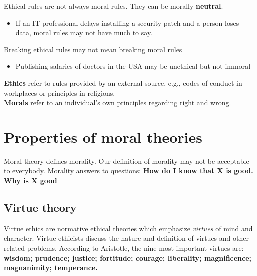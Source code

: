 \documentclass{article}
\newcommand{\worddef}[1]{\hyperref[sec:reference]{\textit{#1}}}
\begin{document}
\begin{flushleft}
Ethical rules are not always moral rules. They can be morally \textbf{neutral}.
\begin{itemize}
  \item If an IT professional delays installing a security patch and a person loses data, moral rules may not have much to say.
\end{itemize}
Breaking ethical rules may not mean breaking moral rules
\begin{itemize}
  \item Publishing salaries of doctors in the USA may be unethical but not immoral
\end{itemize}
\textbf{Ethics} refer to rules provided by an external source, e.g., codes of conduct in workplaces or principles in religions.\\ \textbf{Morals} refer to an individual’s own principles regarding right and wrong.

\end{flushleft}

\section{Properties of moral theories}

\begin{flushleft}
Moral theory defines morality. Our definition of morality may not be acceptable to everybody.
Morality answers to questions: \textbf{How do I know that X is good. Why is X good}
\end{flushleft}

\subsection{Virtue theory}
Virtue ethics are normative ethical theories which emphasize \worddef{virtues} of mind and character. Virtue ethicists discuss the nature and definition of virtues and other related problems. According to Aristotle, the nine most important virtues are: \textbf{wisdom; prudence; justice; fortitude; courage; liberality; magnificence; magnanimity; temperance.}
\end{document}
